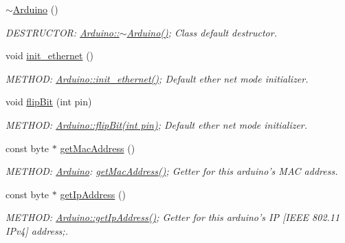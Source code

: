 \begin{DoxyCompactItemize}
\hyperlink{classArduino_a9e70a2c4fd95f0a432845209ec3b6c11_a9e70a2c4fd95f0a432845209ec3b6c11}{$\sim$Arduino} ()
\begin{DoxyCompactList}\small\item\em DESTRUCTOR: \hyperlink{classArduino_a9e70a2c4fd95f0a432845209ec3b6c11_a9e70a2c4fd95f0a432845209ec3b6c11}{Arduino::$\sim$Arduino()}; Class default destructor. \item\end{DoxyCompactList}\item 
void \hyperlink{classArduino_a1839d0c9bcb7c8b7f3fef2d8ac9eaad0_a1839d0c9bcb7c8b7f3fef2d8ac9eaad0}{init\_\-ethernet} ()
\begin{DoxyCompactList}\small\item\em METHOD: \hyperlink{classArduino_a1839d0c9bcb7c8b7f3fef2d8ac9eaad0_a1839d0c9bcb7c8b7f3fef2d8ac9eaad0}{Arduino::init\_\-ethernet()}; Default ether net mode initializer. \item\end{DoxyCompactList}\item 
void \hyperlink{classArduino_a8fdf3b0eb1551c18de943099a391dc45_a8fdf3b0eb1551c18de943099a391dc45}{flipBit} (int pin)
\begin{DoxyCompactList}\small\item\em METHOD: \hyperlink{classArduino_a8fdf3b0eb1551c18de943099a391dc45_a8fdf3b0eb1551c18de943099a391dc45}{Arduino::flipBit(int pin)}; Default ether net mode initializer. \item\end{DoxyCompactList}\item 
const byte $\ast$ \hyperlink{classArduino_a41e64fc2b71a7a7d4483174bfb6ce652_a41e64fc2b71a7a7d4483174bfb6ce652}{getMacAddress} ()
\begin{DoxyCompactList}\small\item\em METHOD: \hyperlink{classArduino}{Arduino}: \hyperlink{classArduino_a41e64fc2b71a7a7d4483174bfb6ce652_a41e64fc2b71a7a7d4483174bfb6ce652}{getMacAddress()}; Getter for this arduino's MAC address. \item\end{DoxyCompactList}\item 
const byte $\ast$ \hyperlink{classArduino_ae412da451a2a3df9b8c123b98b188b7b_ae412da451a2a3df9b8c123b98b188b7b}{getIpAddress} ()
\begin{DoxyCompactList}\small\item\em METHOD: \hyperlink{classArduino_ae412da451a2a3df9b8c123b98b188b7b_ae412da451a2a3df9b8c123b98b188b7b}{Arduino::getIpAddress()}; Getter for this arduino's IP \mbox{[}IEEE 802.11 IPv4\mbox{]} address;. \item\end{DoxyCompactList}\item 

\end{DoxyCompactItemize}
